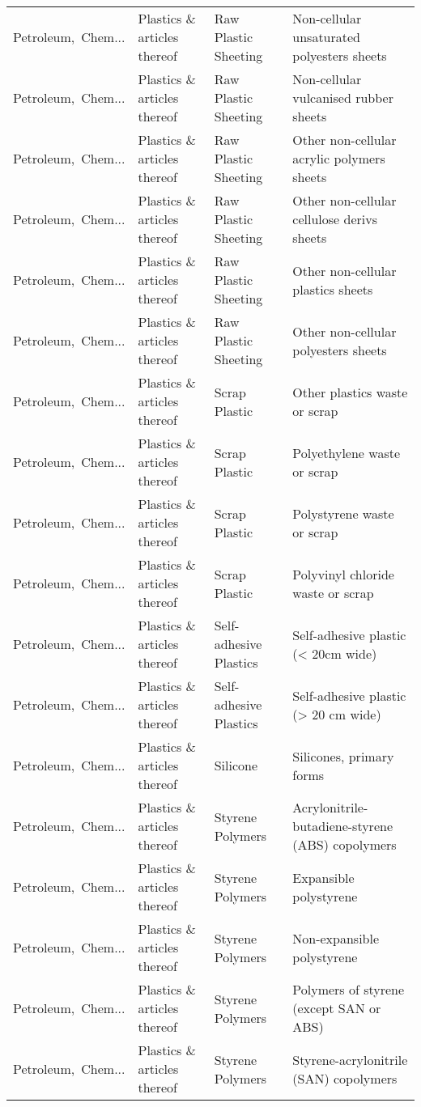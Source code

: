 \begin{appendices}
\begin{xltabular}{\textwidth}{|p{0.10\textwidth}|p{0.25\textwidth}|p{0.24\textwidth}|p{0.31\textwidth}|}
Petroleum,\ Chem... & Plastics \& articles thereof & Raw Plastic Sheeting & Non-cellular unsaturated polyesters sheets \\
Petroleum,\ Chem... & Plastics \& articles thereof & Raw Plastic Sheeting & Non-cellular vulcanised rubber sheets \\
Petroleum,\ Chem... & Plastics \& articles thereof & Raw Plastic Sheeting & Other non-cellular acrylic polymers sheets \\
Petroleum,\ Chem... & Plastics \& articles thereof & Raw Plastic Sheeting & Other non-cellular cellulose derivs sheets \\
Petroleum,\ Chem... & Plastics \& articles thereof & Raw Plastic Sheeting & Other non-cellular plastics sheets \\
Petroleum,\ Chem... & Plastics \& articles thereof & Raw Plastic Sheeting & Other non-cellular polyesters sheets  \\
Petroleum,\ Chem... & Plastics \& articles thereof & Scrap Plastic & Other plastics waste or scrap \\
Petroleum,\ Chem... & Plastics \& articles thereof & Scrap Plastic & Polyethylene waste or scrap \\
Petroleum,\ Chem... & Plastics \& articles thereof & Scrap Plastic & Polystyrene waste or scrap \\
Petroleum,\ Chem... & Plastics \& articles thereof & Scrap Plastic & Polyvinyl chloride waste or scrap \\
Petroleum,\ Chem... & Plastics \& articles thereof & Self-adhesive Plastics & Self-adhesive plastic (< 20cm wide) \\
Petroleum,\ Chem... & Plastics \& articles thereof & Self-adhesive Plastics & Self-adhesive plastic (> 20 cm wide) \\
Petroleum,\ Chem... & Plastics \& articles thereof & Silicone & Silicones, primary forms \\
Petroleum,\ Chem... & Plastics \& articles thereof & Styrene Polymers & Acrylonitrile-butadiene-styrene (ABS) copolymers \\
Petroleum,\ Chem... & Plastics \& articles thereof & Styrene Polymers & Expansible polystyrene \\
Petroleum,\ Chem... & Plastics \& articles thereof & Styrene Polymers & Non-expansible polystyrene \\
Petroleum,\ Chem... & Plastics \& articles thereof & Styrene Polymers & Polymers of styrene (except SAN or ABS) \\
Petroleum,\ Chem... & Plastics \& articles thereof & Styrene Polymers & Styrene-acrylonitrile (SAN) copolymers \\

\end{xltabular}
\end{appendices}
